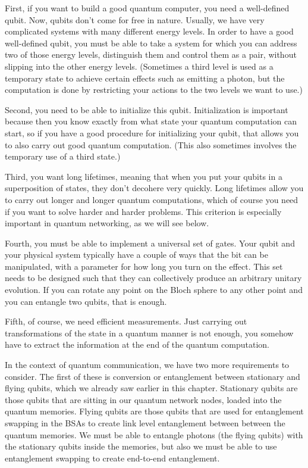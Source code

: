 First, if you want to build a good quantum computer, you need a well-defined qubit. Now, qubits don't come for free in nature. Usually, we have very complicated systems with many different energy levels. In order to have a good well-defined qubit, you must be able to take a system for which you can address two of those energy levels, distinguish them and control them as a pair, without slipping into the other energy levels.  (Sometimes a third level is used as a temporary state to achieve certain effects such as emitting a photon, but the computation is done by restricting your actions to the two levels we want to use.)

Second, you need to be able to initialize this qubit. Initialization is important because then you know exactly from what state your quantum computation can start, so if you have a good procedure for initializing your qubit, that allows you to also carry out good quantum computation.  (This also sometimes involves the temporary use of a third state.)

Third, you want long lifetimes, meaning that when you put your qubits in a superposition of states, they don't decohere very quickly. Long lifetimes allow you to carry out longer and longer quantum computations, which of course you need if you want to solve harder and harder problems.  This criterion is especially important in quantum networking, as we will see below.

Fourth, you must be able to implement a universal set of gates. Your qubit and your physical system typically have a couple of ways that the bit can be manipulated, with a parameter for how long you turn on the effect.  This set needs to be designed such that they can collectively produce an arbitrary unitary evolution. If you can rotate any point on the Bloch sphere to any other point and you can entangle two qubits, that is enough.

Fifth, of course, we need efficient measurements. Just carrying out transformations of the state in a quantum manner is not enough, you somehow have to extract the information at the end of the quantum computation.

In the context of quantum communication, we have two more requirements to consider. The first of these is conversion or entanglement between stationary and flying qubits, which we already saw earlier in this chapter. Stationary qubits are those qubits that are sitting in our quantum network nodes, loaded into the quantum memories.
Flying qubits are those qubits that are used for entanglement swapping in the BSAs to create link level entanglement between between the quantum memories. We must be able to entangle photons (the flying qubits) with the stationary qubits inside the memories, but also we must be able to use entanglement swapping to create end-to-end entanglement.


